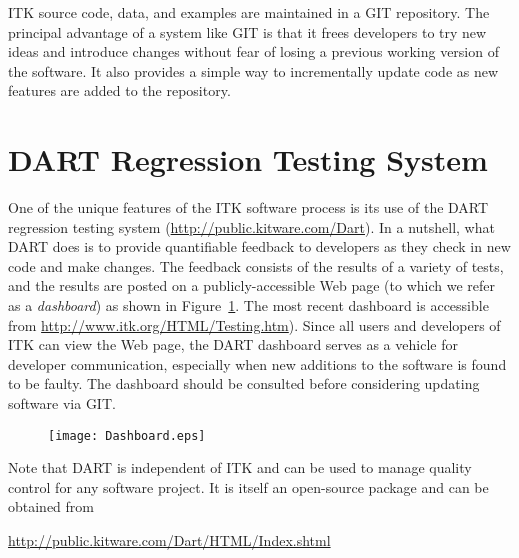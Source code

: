 ITK source code, data, and examples are maintained in a GIT repository.  The
principal advantage of a system like GIT is that it frees developers to try
new ideas and introduce changes without fear of losing a previous working
version of the software. It also provides a simple way to incrementally
update code as new features are added to the repository.



\section{DART Regression Testing System}
\label{sec:DART}
\label{sec:QualityDashboard}


One of the unique features of the ITK software process is its use of the DART
regression testing system (\url{http://public.kitware.com/Dart}). In a
nutshell, what DART does is to provide quantifiable feedback to developers as
they check in new code and make changes. The feedback consists of the results
of a variety of tests, and the results are posted on a publicly-accessible
Web page (to which we refer as a \emph{dashboard}) as shown in
Figure~\ref{fig:Dashboard}. The most recent dashboard is accessible from
\url{http://www.itk.org/HTML/Testing.htm}). Since all users and developers of
ITK can view the Web page, the DART dashboard serves as a vehicle for
developer communication, especially when new additions to the software is
found to be faulty.  The dashboard should be consulted before considering
updating software via GIT.


\begin{figure}[ht]
\centering 
\texttt{[image: Dashboard.eps]}
\label{fig:Dashboard}
\end{figure}

Note that DART is independent of ITK and can be used to manage quality
control for any software project. It is itself an open-source package and can
be obtained from

\begin{center} 
\url{http://public.kitware.com/Dart/HTML/Index.shtml}
\end{center} 


